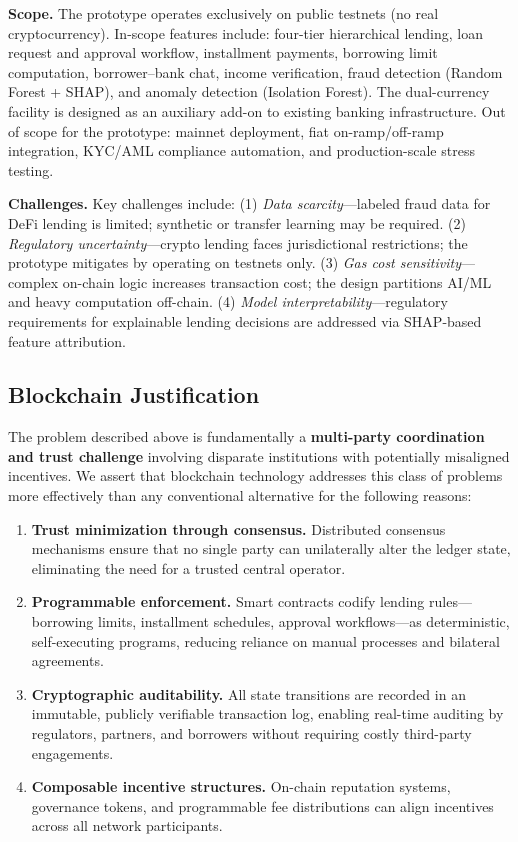 \documentclass[11pt,a4paper]{article}
\begin{document}
\textbf{Scope.} The prototype operates exclusively on public testnets (no real cryptocurrency). In-scope features include: four-tier hierarchical lending, loan request and approval workflow, installment payments, borrowing limit computation, borrower--bank chat, income verification, fraud detection (Random Forest + SHAP), and anomaly detection (Isolation Forest). The dual-currency facility is designed as an auxiliary add-on to existing banking infrastructure. Out of scope for the prototype: mainnet deployment, fiat on-ramp/off-ramp integration, KYC/AML compliance automation, and production-scale stress testing.

\textbf{Challenges.} Key challenges include: (1) \textit{Data scarcity}---labeled fraud data for DeFi lending is limited; synthetic or transfer learning may be required. (2) \textit{Regulatory uncertainty}---crypto lending faces jurisdictional restrictions; the prototype mitigates by operating on testnets only. (3) \textit{Gas cost sensitivity}---complex on-chain logic increases transaction cost; the design partitions AI/ML and heavy computation off-chain. (4) \textit{Model interpretability}---regulatory requirements for explainable lending decisions are addressed via SHAP-based feature attribution.

\subsection{Blockchain Justification}

The problem described above is fundamentally a \textbf{multi-party coordination and trust challenge} involving disparate institutions with potentially misaligned incentives. We assert that blockchain technology addresses this class of problems more effectively than any conventional alternative for the following reasons:

\begin{enumerate}[noitemsep]
\item \textbf{Trust minimization through consensus.} Distributed consensus mechanisms ensure that no single party can unilaterally alter the ledger state, eliminating the need for a trusted central operator.

\item \textbf{Programmable enforcement.} Smart contracts codify lending rules—borrowing limits, installment schedules, approval workflows—as deterministic, self-executing programs, reducing reliance on manual processes and bilateral agreements.

\item \textbf{Cryptographic auditability.} All state transitions are recorded in an immutable, publicly verifiable transaction log, enabling real-time auditing by regulators, partners, and borrowers without requiring costly third-party engagements.

\item \textbf{Composable incentive structures.} On-chain reputation systems, governance tokens, and programmable fee distributions can align incentives across all network participants.
\end{enumerate}
\end{document}
